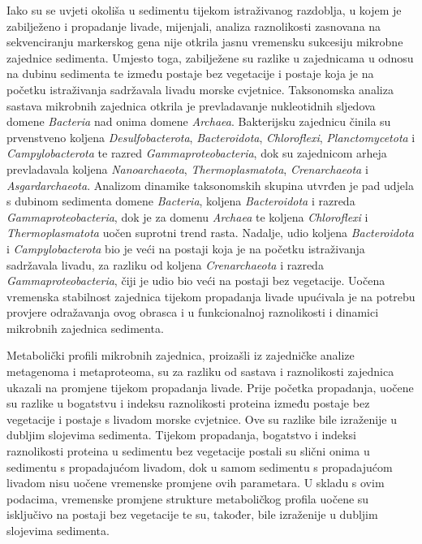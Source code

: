 \documentclass[
  12 pt,
]{book}
\begin{document}
{Iako su se uvjeti okoliša u sedimentu tijekom istraživanog razdoblja, u kojem je zabilježeno i propadanje livade, mijenjali, analiza raznolikosti zasnovana na sekvenciranju markerskog gena nije otkrila jasnu vremensku sukcesiju mikrobne zajednice sedimenta. Umjesto toga, zabilježene su razlike u zajednicama u odnosu na dubinu sedimenta te između postaje bez vegetacije i postaje koja je na početku istraživanja sadržavala livadu morske cvjetnice. Taksonomska analiza sastava mikrobnih zajednica otkrila je prevladavanje nukleotidnih sljedova domene \emph{Bacteria} nad onima domene \emph{Archaea}. Bakterijsku zajednicu činila su prvenstveno koljena \emph{Desulfobacterota}, \emph{Bacteroidota}, \emph{Chloroflexi}, \emph{Planctomycetota} i \emph{Campylobacterota} te razred \emph{Gammaproteobacteria}, dok su zajednicom arheja prevladavala koljena \emph{Nanoarchaeota}, \emph{Thermoplasmatota}, \emph{Crenarchaeota} i \emph{Asgardarchaeota}. Analizom dinamike taksonomskih skupina utvrđen je pad udjela s dubinom sedimenta domene \emph{Bacteria}, koljena \emph{Bacteroidota} i razreda \emph{Gammaproteobacteria}, dok je za domenu \emph{Archaea} te koljena \emph{Chloroflexi} i \emph{Thermoplasmatota} uočen suprotni trend rasta. Nadalje, udio koljena \emph{Bacteroidota} i \emph{Campylobacterota} bio je veći na postaji koja je na početku istraživanja sadržavala livadu, za razliku od koljena \emph{Crenarchaeota} i razreda \emph{Gammaproteobacteria}, čiji je udio bio veći na postaji bez vegetacije. Uočena vremenska stabilnost zajednica tijekom propadanja livade upućivala je na potrebu provjere odražavanja ovog obrasca i u funkcionalnoj raznolikosti i dinamici mikrobnih zajednica sedimenta.

Metabolički profili mikrobnih zajednica, proizašli iz zajedničke analize metagenoma i metaproteoma, su za razliku od sastava i raznolikosti zajednica ukazali na promjene tijekom propadanja livade. Prije početka propadanja, uočene su razlike u bogatstvu i indeksu raznolikosti proteina između postaje bez vegetacije i postaje s livadom morske cvjetnice. Ove su razlike bile izraženije u dubljim slojevima sedimenta. Tijekom propadanja, bogatstvo i indeksi raznolikosti proteina u sedimentu bez vegetacije postali su slični onima u sedimentu s propadajućom livadom, dok u samom sedimentu s propadajućom livadom nisu uočene vremenske promjene ovih parametara. U skladu s ovim podacima, vremenske promjene strukture metaboličkog profila uočene su isključivo na postaji bez vegetacije te su, također, bile izraženije u dubljim slojevima sedimenta.

}
\end{document}
